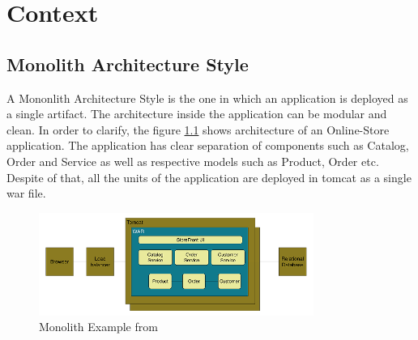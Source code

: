 \chapter{Context}\label{chapter:context}
\section{Monolith Architecture Style}\label{section:context/monolith}
A Mononlith Architecture Style is the one in which an application is deployed as a single artifact. The architecture inside the application can be modular and clean. In order to clarify, the figure \ref{fig:context/monolith-example} shows architecture of an Online-Store application. The application has clear separation of components such as Catalog, Order and Service as well as respective models such as Product, Order etc. Despite of that, all the units of the application are deployed in tomcat as a single war file.\cite{Richardson:2014aa}\cite{Richardson:2014ab}

\begin{figure}[H]
\begin{center}
\includegraphics[width=0.8\textwidth]{figures/context-monolith-example}
\caption{Monolith Example from \cite{Richardson:2014aa}}
\label{fig:context/monolith-example}
\end{center}
\end{figure}

